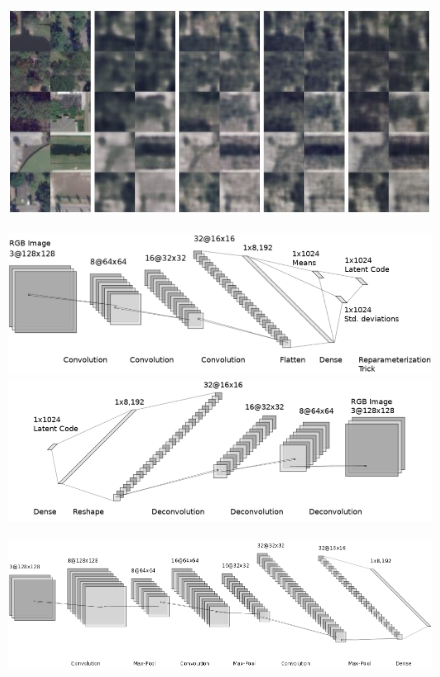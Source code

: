 \begin{frame}
	\begin{figure}
		\includegraphics[width=\textwidth]{images/figures/presentation/num_filters_reconstructions.jpg}
	\end{figure} 
\end{frame}

\begin{frame}
	\begin{figure}
		\includegraphics[width=\textwidth]{images/figures/encoder_neural_network.png}
		\includegraphics[width=\textwidth]{images/figures/decoder_neural_network.png}
	\end{figure}
\end{frame}

\begin{frame}
	\begin{figure}
		\includegraphics[width=\textwidth]{images/figures/encoder_pooling.png}
	\end{figure}
\end{frame}

